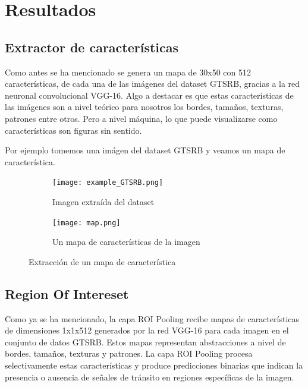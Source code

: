 \newpage
\section{Resultados}
    \subsection{Extractor de características}
    Como antes se ha mencionado se genera un mapa de 30x50 con 512 características, de cada una de las imágenes del dataset GTSRB, gracias a la red neuronal convolucional VGG-16. Algo a destacar es que estas características de las imágenes son a nivel teórico para nosotros los bordes, tamaños, texturas, patrones entre otros. Pero a nivel máquina, lo que puede visualizarse como características son figuras sin sentido.

    Por ejemplo tomemos una imágen del dataset GTSRB y veamos un mapa de característica.


    \begin{figure}[ht]
			\centering
			\begin{subfigure}[t]{.47\textwidth}
				\centering
				\texttt{[image: example\_GTSRB.png]}
                \caption{Imagen extraída del dataset}
			\end{subfigure}
			\begin{subfigure}[t]{.47\textwidth}
				\centering
				\texttt{[image: map.png]}
                \caption{Un mapa de características de la imagen}
			\end{subfigure}
			\caption{Extracción de un mapa de característica}
	\end{figure}	


    \subsection{Region Of Intereset}
    Como ya se ha mencionado, la capa ROI Pooling recibe mapas de características de dimensiones 1x1x512 generados por la red VGG-16 para cada imagen en el conjunto de datos GTSRB. Estos mapas representan abstracciones a nivel de bordes, tamaños, texturas y patrones. La capa ROI Pooling procesa selectivamente estas características y produce predicciones binarias que indican la presencia o ausencia de señales de tránsito en regiones específicas de la imagen.
    
